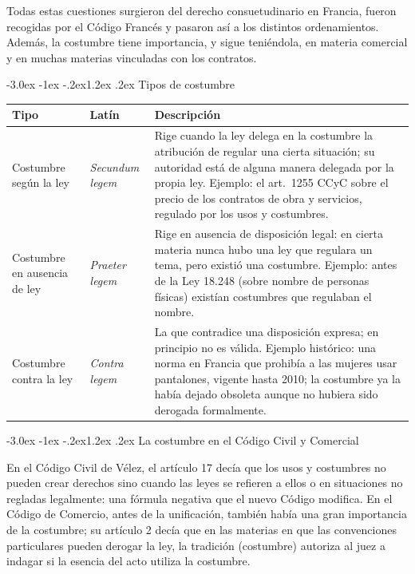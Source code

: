 \documentclass[12pt,oneside]{book}
\makeatletter
\renewcommand\section{\@startsection{section}{1}{\z@}%
  {-3.0ex \@plus -1ex \@minus -.2ex}{1.2ex \@plus .2ex}%
  {\normalfont\large\bfseries\color{acento}}}
\makeatother
\begin{document}
Todas estas cuestiones surgieron del derecho consuetudinario en Francia, fueron recogidas por el Código Francés y pasaron así a los distintos ordenamientos. Además, la costumbre tiene importancia, y sigue teniéndola, en materia comercial y en muchas materias vinculadas con los contratos.

\section{Tipos de costumbre}

\begin{table}[H]
\centering
\begin{tabularx}{\textwidth}{>{\raggedright\arraybackslash}p{} >{\raggedright\arraybackslash}p{} >{\raggedright\arraybackslash}X}
\toprule
\textbf{Tipo} & \textbf{Latín} & \textbf{Descripción} \\
\midrule
Costumbre según la ley & \textit{Secundum legem} &
Rige cuando la ley delega en la costumbre la atribución de regular una cierta situación; su autoridad está de alguna manera delegada por la propia ley. Ejemplo: el art.~1255 CCyC sobre el precio de los contratos de obra y servicios, regulado por los usos y costumbres. \\
\addlinespace
Costumbre en ausencia de ley & \textit{Praeter legem} &
Rige en ausencia de disposición legal: en cierta materia nunca hubo una ley que regulara un tema, pero existió una costumbre. Ejemplo: antes de la Ley 18.248 (sobre nombre de personas físicas) existían costumbres que regulaban el nombre. \\
\addlinespace
Costumbre contra la ley & \textit{Contra legem} &
La que contradice una disposición expresa; en principio no es válida. Ejemplo histórico: una norma en Francia que prohibía a las mujeres usar pantalones, vigente hasta 2010; la costumbre ya la había dejado obsoleta aunque no hubiera sido derogada formalmente. \\
\bottomrule
\end{tabularx}
\end{table}

\section{La costumbre en el Código Civil y Comercial}

En el Código Civil de Vélez, el artículo 17 decía que los usos y costumbres no pueden crear derechos sino cuando las leyes se refieren a ellos o en situaciones no regladas legalmente: una fórmula negativa que el nuevo Código modifica. En el Código de Comercio, antes de la unificación, también había una gran importancia de la costumbre; su artículo 2 decía que en las materias en que las convenciones particulares pueden derogar la ley, la tradición (costumbre) autoriza al juez a indagar si la esencia del acto utiliza la costumbre.
\end{document}

